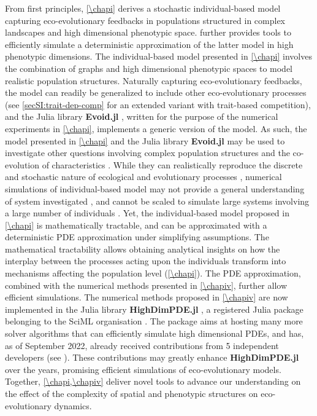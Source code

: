 From first principles, \cref{\chapi} derives a stochastic individual-based model capturing eco-evolutionary feedbacks in populations structured in complex landscapes and high dimensional phenotypic space. \Cref{\chapiv} further provides tools to efficiently simulate a deterministic approximation of the latter model in high phenotypic dimensions.
% 
The individual-based model presented in \cref{\chapi} involves the combination of graphs and high dimensional phenotypic spaces to model realistic population structures. Naturally capturing eco-evolutionary feedbacks, the model can readily be generalized to include other eco-evolutionary processes (see \cref{secSI:trait-dep-comp} for an extended variant with trait-based competition), and the Julia library \textbf{Evoid.jl} \citep{Evoid}, written for the purpose of the numerical experiments in \cref{\chapi}, implements a generic version of the model. %
% 
As such, the model presented in \cref{\chapi} and the Julia library \textbf{Evoid.jl} may be used to investigate other questions involving complex population structures \citep{LiebermanHauert2005} and the co-evolution of characteristics \citep{Doebeli2011}.
% 
While they can realistically reproduce the discrete and stochastic nature of ecological and evolutionary processes \citep{deangelis2005individual}, numerical simulations of individual-based model may not provide a general understanding of system investigated \citep{Lion2016,Hodgson2019}, and cannot be scaled to simulate large systems involving a large number of individuals \citep{deangelis2005individual}. Yet, the individual-based model proposed in \cref{\chapi} is mathematically tractable, and can be approximated with a deterministic PDE approximation under simplifying assumptions.
% 
The mathematical tractability allows obtaining analytical insights on how the interplay between the processes acting upon the individuals transform into mechanisms affecting the population level (\cref{\chapi}).
% 
The PDE approximation, combined with the numerical methods presented in \cref{\chapiv}, further allow efficient simulations. 
% 
The numerical methods proposed in \cref{\chapiv} are now implemented in the Julia library \textbf{HighDimPDE.jl} \citep{HighDimPDE}, a registered Julia package belonging to the SciML organisation \citep{Rackauckas2020a}.
%
The package aims at hosting many more solver algorithms that can efficiently simulate high dimensional PDEs, and has, as of September 2022, already received contributions from 5 independent developers (see \cite{contribHighDimPDE}). These contributions may greatly enhance \textbf{HighDimPDE.jl} over the years, promising efficient simulations of eco-evolutionary models.
% 
Together, \cref{\chapi,\chapiv} deliver novel tools to advance our understanding on the effect of the complexity of spatial and phenotypic structures on eco-evolutionary dynamics.


